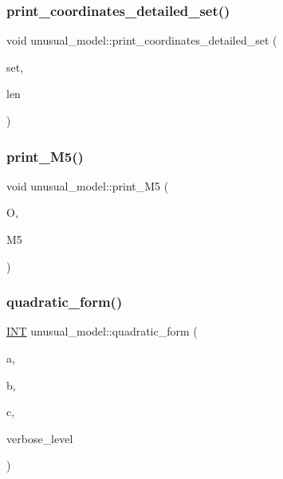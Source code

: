 \subsubsection{\texorpdfstring{print\+\_\+coordinates\+\_\+detailed\+\_\+set()}{print\_coordinates\_detailed\_set()}}
{\footnotesize\ttfamily void unusual\+\_\+model\+::print\+\_\+coordinates\+\_\+detailed\+\_\+set (\begin{DoxyParamCaption}\item[{\mbox{\hyperlink{galois_8h_a09fddde158a3a20bd2dcadb609de11dc}{I\+NT}} $\ast$}]{set,  }\item[{\mbox{\hyperlink{galois_8h_a09fddde158a3a20bd2dcadb609de11dc}{I\+NT}}}]{len }\end{DoxyParamCaption})}

\mbox{\label{classunusual__model_a7d6f0ad4e7c431c87d024ff602a51d5d}} 
\subsubsection{\texorpdfstring{print\+\_\+\+M5()}{print\_M5()}}
{\footnotesize\ttfamily void unusual\+\_\+model\+::print\+\_\+\+M5 (\begin{DoxyParamCaption}\item[{\mbox{\hyperlink{classorthogonal}{orthogonal}} $\ast$}]{O,  }\item[{\mbox{\hyperlink{galois_8h_a09fddde158a3a20bd2dcadb609de11dc}{I\+NT}} $\ast$}]{M5 }\end{DoxyParamCaption})}

\mbox{\label{classunusual__model_ac7ab7b2188e8fa92768a878a726fbf9a}} 
\subsubsection{\texorpdfstring{quadratic\+\_\+form()}{quadratic\_form()}}
{\footnotesize\ttfamily \mbox{\hyperlink{galois_8h_a09fddde158a3a20bd2dcadb609de11dc}{I\+NT}} unusual\+\_\+model\+::quadratic\+\_\+form (\begin{DoxyParamCaption}\item[{\mbox{\hyperlink{galois_8h_a09fddde158a3a20bd2dcadb609de11dc}{I\+NT}}}]{a,  }\item[{\mbox{\hyperlink{galois_8h_a09fddde158a3a20bd2dcadb609de11dc}{I\+NT}}}]{b,  }\item[{\mbox{\hyperlink{galois_8h_a09fddde158a3a20bd2dcadb609de11dc}{I\+NT}}}]{c,  }\item[{\mbox{\hyperlink{galois_8h_a09fddde158a3a20bd2dcadb609de11dc}{I\+NT}}}]{verbose\+\_\+level }\end{DoxyParamCaption})}

